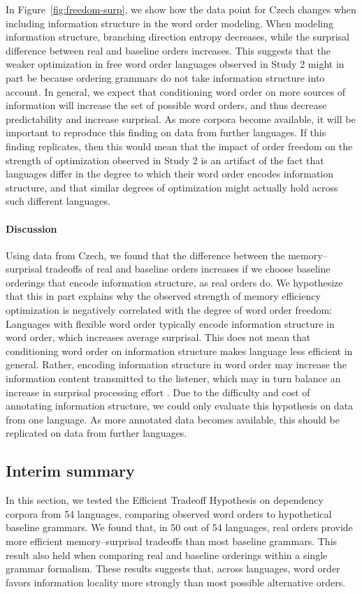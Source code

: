 In Figure~\ref{fig:freedom-surp}, we show how the data point for Czech changes when including information structure in the  word order modeling. When modeling information structure, branching direction entropy decreases, while the surprisal difference between real and baseline orders increases.
This suggests that the weaker optimization in free word order languages observed in Study 2 might in part be because ordering grammars do not take information structure into account.
In general, we expect that conditioning word order on more sources of information will increase the set of possible word orders, and thus decrease predictability and increase surprisal.
As more corpora become available, it will be important to reproduce this finding on data from further languages.
If this finding replicates, then this would mean that the impact of order freedom on the strength of optimization observed in Study 2 is an artifact of the fact that languages differ in the degree to which their word order encodes information structure, and that similar degrees of optimization might actually hold across such different languages.
	
\paragraph{Discussion}
Using data from Czech, we found that the difference between the memory--surprisal tradeoffs of real and baseline orders increases if we choose baseline orderings that encode information structure, as real orders do.
We hypothesize that this in part explains why the observed strength of memory efficiency optimization is negatively correlated with the degree of word order freedom:
Languages with flexible word order typically encode information structure in word order, which increases average surprisal.
This does not mean that conditioning word order on information structure makes language less efficient in general.
Rather, encoding information structure in word order may increase the information content transmitted to the listener, which may in turn balance an increase in surprisal processing effort \citep{hahn2020universals}.
Due to the difficulty and cost of annotating information structure, we could only evaluate this hypothesis on data from one language.
As more annotated data becomes available, this should be replicated on data from further languages.


\subsection{Interim summary}
In this section, we tested the Efficient Tradeoff Hypothesis on dependency corpora from 54 languages, comparing observed word orders to hypothetical baseline grammars.
We found that, in 50 out of 54 languages, real orders provide more efficient memory--surprisal tradeoffs than most baseline grammars.
This result also held when comparing real and baseline orderings within a single grammar formalism.
These results suggests that, across languages, word order favors information locality more strongly than most possible alternative orders.

